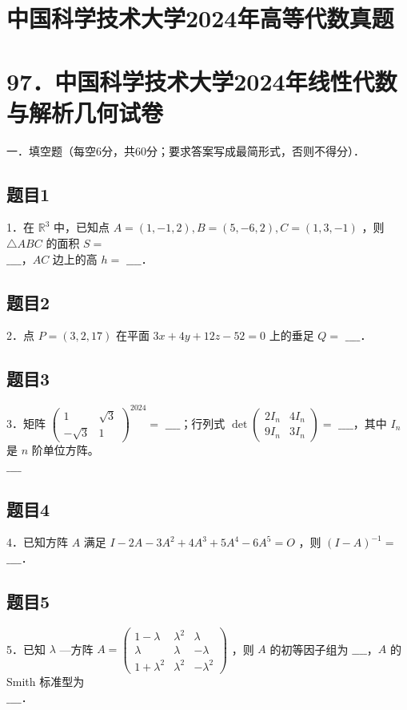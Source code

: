 \documentclass{article}
\begin{document}
\section*{中国科学技术大学2024年高等代数真题}
\section*{97．中国科学技术大学2024年线性代数与解析几何试卷}
一．填空题（每空6分，共60分；要求答案写成最简形式，否则不得分）．\\

\subsection{题目1}
1．在 \(\mathbb{R}^{3}\) 中，已知点 \(A=(1,-1,2), B=(5,-6,2), C=(1,3,-1)\) ，则 \(\triangle A B C\) 的面积 \(S=\)\\
\(\_\_\_\_\)，\(A C\) 边上的高 \(h=\) \(\_\_\_\_\)．

\subsection{题目2}
2．点 \(P=(3,2,17)\) 在平面 \(3 x+4 y+12 z-52=0\) 上的垂足 \(Q=\) \(\_\_\_\_\)．

\subsection{题目3}
3．矩阵 \(\left(\begin{array}{cc}1 & \sqrt{3} \\ -\sqrt{3} & 1\end{array}\right)^{2024}=\) \(\_\_\_\_\)；行列式 \(\operatorname{det}\left(\begin{array}{ll}2 I_{n} & 4 I_{n} \\ 9 I_{n} & 3 I_{n}\end{array}\right)=\) \(\_\_\_\_\)，其中 \(I_{n}\) 是 \(n\) 阶单位方阵。\\
\(\_\_\_\_\)

\subsection{题目4}
4．已知方阵 \(A\) 满足 \(I-2 A-3 A^{2}+4 A^{3}+5 A^{4}-6 A^{5}=O\) ，则 \((I-A)^{-1}=\) \(\_\_\_\_\)．

\subsection{题目5}
5．已知 \(\lambda\) —方阵 \(A=\left(\begin{array}{ccc}1-\lambda & \lambda^{2} & \lambda \\ \lambda & \lambda & -\lambda \\ 1+\lambda^{2} & \lambda^{2} & -\lambda^{2}\end{array}\right)\) ，则 \(A\) 的初等因子组为 \(\_\_\_\_\)，\(A\) 的 Smith 标准型为\\
\(\_\_\_\_\)．
\end{document}
